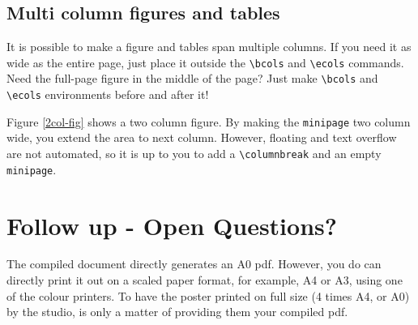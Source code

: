 \documentclass{article}
\begin{document}
\subsection*{Multi column figures and tables}
It is possible to make a figure and tables span multiple columns. If you need it as wide as the entire page, just place it outside the \verb|\bcols| and \verb|\ecols| commands. Need the full-page figure in the middle of the page? Just make \verb|\bcols| and \verb|\ecols| environments before and after it!

\pushdown
\begin{minipage}[b]{\columnwidth}
\end{minipage}

\columnbreak

\vspace{20pt plus 10pt minus 5pt}
\vspace{-1em}

Figure \ref{2col-fig} shows a two column figure. By making the \verb|minipage| two column wide, you extend the area to next column. However, floating and text overflow are not automated, so it is up to you to add a \verb|\columnbreak| and an empty \verb|minipage|.



\section*{Follow up - Open Questions?}
The compiled \latex document directly generates an A0 pdf. However, you do can directly print it out on a scaled paper format, for example, A4 or A3, using one of the colour printers.
To have the poster printed on full size (4 times A4, or A0) by the studio, is only a matter of providing them your compiled pdf.
\end{document}
